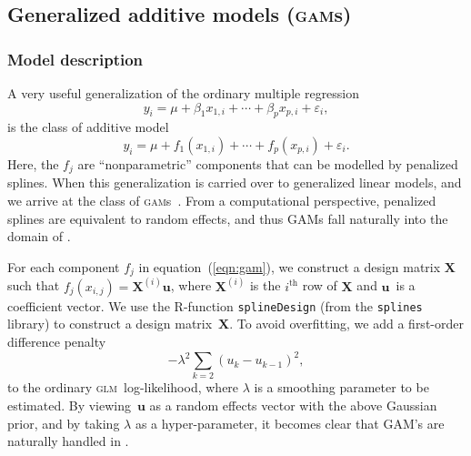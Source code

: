 \documentclass{admbmanual}
\newcommand{\scGAM}{\textsc{gam}}
\newcommand{\scGLM}{\textsc{glm}}
\begin{document}

\subsection{Generalized additive models (\scGAM{}s)}
\label{sec:gam}

\subsubsection{Model description}

A very useful generalization of the ordinary multiple regression
\[
y_{i}=\mu +\beta _{1}x_{1,i}+\cdots +\beta _{p}x_{p,i}+\varepsilon _{i},
\]%
is the class of additive model
\begin{equation}
y_{i}=\mu +f_{1}(x_{1,i})+\cdots +f_{p}(x_{p,i})+\varepsilon _{i}.
\label{eqn:gam}
\end{equation}%
Here, the $f_{j}$ are ``nonparametric'' components that can be modelled by
penalized splines. When this generalization is carried over to generalized
linear models, and we arrive at the class of \scGAM{}s~\cite{hast:tibs:1990}.
From a computational perspective, penalized splines are equivalent to random
effects, and thus GAMs fall naturally into the domain of \scAR.

For each component $f_{j}$ in equation~(\ref{eqn:gam}), we construct a design
matrix $\mathbf{X}$ such that $f_{j}(x_{i,j})=\mathbf{X}^{(i)}\mathbf{u}$, where
$\mathbf{X}^{(i)}$ is the $i^\textrm{th}$ row of $\mathbf{X}$ and $\mathbf{u}$\
is a coefficient vector. We use the R-function \texttt{splineDesign} (from the
\texttt{splines} library) to construct a design matrix~$\mathbf{X}$. To avoid
overfitting, we add a first-order difference penalty~\cite{eile:marx:1996}
\index{splines!difference penalty}
\begin{equation}
-\lambda ^{2}\sum_{k=2}\left( u_{k}-u_{k-1}\right) ^{2},
\label{eqn:first_order}
\end{equation}
to the ordinary \scGLM\ log-likelihood, where $\lambda $ is a smoothing
parameter to be estimated. By viewing~$\mathbf{u}$ as a random effects vector
with the above Gaussian prior, and by taking $\lambda $ as a hyper-parameter, it
becomes clear that GAM's are naturally handled in \scAR.
\end{document}
